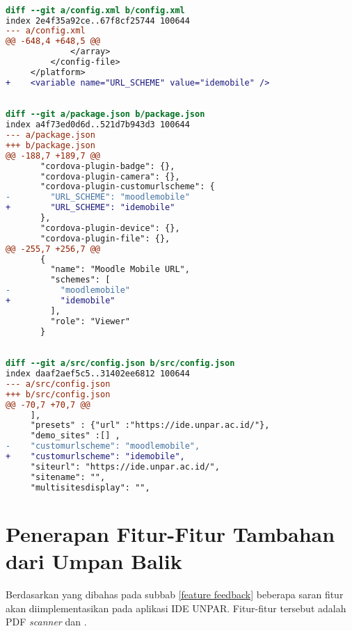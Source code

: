 \begin{lstlisting}[language=diff, frame=single, label ={config.xml-scheme}, caption = Perubahan pada \texttt{customurlscheme} file \texttt{config.xml} ]

diff --git a/config.xml b/config.xml
index 2e4f35a92ce..67f8cf25744 100644
--- a/config.xml
@@ -648,4 +648,5 @@
             </array>
         </config-file>
     </platform>
+    <variable name="URL_SCHEME" value="idemobile" />
\end{lstlisting} 

\begin{lstlisting}[language=diff, frame=single, label ={package.json-scheme}, caption = Perubahan pada \texttt{customurlscheme} file \texttt{package.json} ]

diff --git a/package.json b/package.json
index a4f73ed0d6d..521d7b943d3 100644
--- a/package.json
+++ b/package.json
@@ -188,7 +189,7 @@
       "cordova-plugin-badge": {},
       "cordova-plugin-camera": {},
       "cordova-plugin-customurlscheme": {
-        "URL_SCHEME": "moodlemobile"
+        "URL_SCHEME": "idemobile"
       },
       "cordova-plugin-device": {},
       "cordova-plugin-file": {},
@@ -255,7 +256,7 @@
       {
         "name": "Moodle Mobile URL",
         "schemes": [
-          "moodlemobile"
+          "idemobile"
         ],
         "role": "Viewer"
       }
\end{lstlisting}

\begin{lstlisting}[language=diff, frame=single, label ={config.json-scheme}, caption = Perubahan pada \texttt{customurlscheme} file \texttt{src/config.json} ]

diff --git a/src/config.json b/src/config.json
index daaf2aef5c5..31402ee6812 100644
--- a/src/config.json
+++ b/src/config.json
@@ -70,7 +70,7 @@
     ],
     "presets" : {"url" :"https://ide.unpar.ac.id/"},
     "demo_sites" :[] ,
-    "customurlscheme": "moodlemobile",
+    "customurlscheme": "idemobile",
     "siteurl": "https://ide.unpar.ac.id/",
     "sitename": "",
     "multisitesdisplay": "",
\end{lstlisting} 

\section{Penerapan Fitur-Fitur Tambahan dari Umpan Balik}

Berdasarkan yang dibahas pada subbab \ref{feature feedback} beberapa saran fitur akan diimplementasikan pada aplikasi IDE UNPAR. Fitur-fitur tersebut adalah PDF \textit{scanner} dan .


